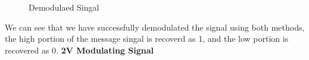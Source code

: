 \documentclass[12pt]{article}
\begin{document}
\begin{figure}[H]
    \centering
    \caption{Demodulaed Singal}
\end{figure}
We can see that we have successfully demodulated the signal using both methods, the high portion of the message singal is recoverd as 1, and the low portion is recovered as 0.
\textbf{2V Modulating Signal}
\end{document}
